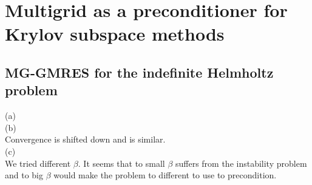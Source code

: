 \documentclass[a4paper,12pt]{article}
\begin{document}
\section{Multigrid as a preconditioner for Krylov subspace methods}

\subsection{MG-GMRES for the indefinite Helmholtz problem}
(a) \\


(b) \\
Convergence is shifted down and is similar.\\
(c) \\
We tried different $\beta$. It seems that to small $\beta$ suffers from the instability problem and
to big $\beta$ would make the problem to different to use to precondition.
\end{document}

